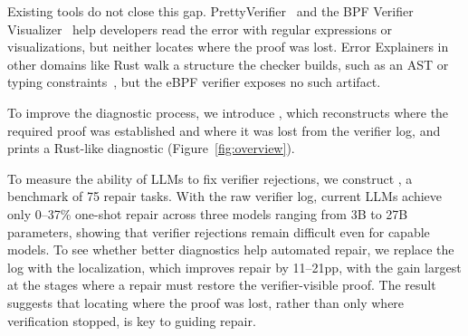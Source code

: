 Existing tools do not close this gap.
PrettyVerifier~\cite{rizza2025design} and the BPF Verifier Visualizer~\cite{bpfvv} help developers read the error with regular expressions or visualizations, but neither locates where the proof was lost.
Error Explainers in other domains like Rust walk a structure the checker builds, such as an AST or typing constraints~\cite{pavlinovic2014finding, zhang2014toward}, but the eBPF verifier exposes no such artifact.

To improve the diagnostic process, we introduce \sys, which reconstructs where the required proof was established and where it was lost from the verifier log, and prints a Rust-like diagnostic (Figure~\ref{fig:overview}).

To measure the ability of LLMs to fix verifier rejections, we construct \bench, a benchmark of 75 repair tasks.
With the raw verifier log, current LLMs achieve only 0--37\% one-shot repair across three models ranging from 3B to 27B parameters, showing that verifier rejections remain difficult even for capable models.
To see whether better diagnostics help automated repair, we replace the log with the \sys localization, which improves repair by 11--21pp, with the gain largest at the stages where a repair must restore the verifier-visible proof.
The result suggests that locating where the proof was lost, rather than only where verification stopped, is key to guiding repair.

